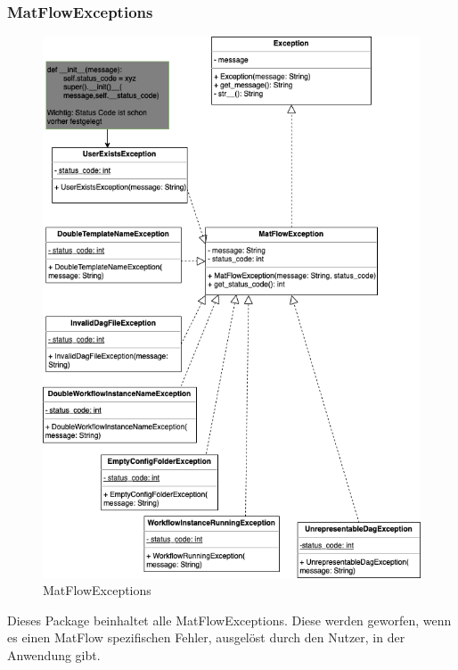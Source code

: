 \subsubsection{MatFlowExceptions}
\begin{figure}[h]
    \includegraphics[width=1\textwidth]{res/Klassen/MatFlowExceptions.png}
    \caption{MatFlowExceptions}
\end{figure}
Dieses Package beinhaltet alle MatFlowExceptions. Diese werden geworfen, wenn es einen MatFlow spezifischen Fehler, ausgelöst 
durch den Nutzer, in der Anwendung gibt.


\newpage